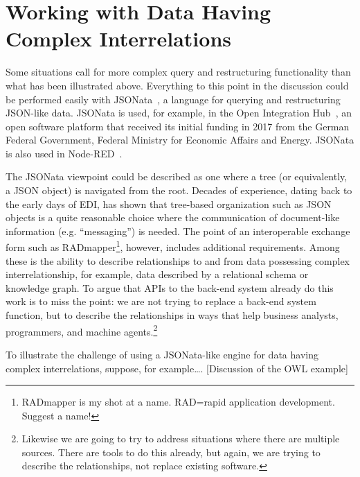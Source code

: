 \documentclass[9pt,letterpaper]{article}
\begin{document}
\section{Working with Data Having Complex Interrelations}

Some situations call for more complex query and restructuring functionality than what has been illustrated above.
Everything to this point in the discussion could be performed easily with JSONata~\cite{Jsonata.org2021}, a language for querying and restructuring JSON-like data.
JSONata is used, for example, in the Open Integration Hub~\cite{OIH2021}, an open software platform that received its initial funding in 2017 from the German Federal Government,
Federal Ministry for Economic Affairs and Energy. %
JSONata is also used in Node-RED~\cite{Node-Red2021}.

The JSONata viewpoint could be described as one where a tree (or equivalently, a JSON object) is navigated from the root.
Decades of experience, dating back to the early days of EDI, has shown that tree-based organization such as JSON objects is a quite reasonable choice where the communication of document-like information (e.g. ``messaging'') is needed.
The point of an interoperable exchange form such as RADmapper\footnote{RADmapper is my shot at a name. RAD=rapid application development. Suggest a name!}, however, includes additional requirements.
Among these is the ability to describe relationships to and from data possessing complex interrelationship, for example, data described by a relational schema or knowledge graph.
To argue that APIs to the back-end system already do this work is to miss the point:
we are not trying to replace a back-end system function, but to describe the relationships in ways that help business analysts, programmers, and machine agents.\footnote{Likewise we are going to try to address
  situations where there are multiple sources. There are tools to do this already, but again, we are trying to describe the relationships, not replace existing software.}

 
To illustrate the challenge of using a JSONata-like engine for data having complex interrelations, suppose, for example\ldots. [Discussion of the OWL example]
\end{document}
